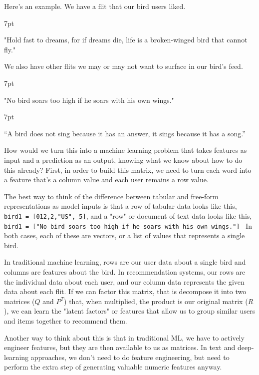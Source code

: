 \documentclass[11pt, table]{diazessay} %
\newenvironment{formal}{%
  \def\FrameCommand{%
	\hspace{1pt}%
	{\color{w_lightblue}\vrule width 2pt}%
	{\color{formalshade}\vrule width 4pt}%
	\colorbox{formalshade}%
  }%
  \MakeFramed{\advance\hsize-\width\FrameRestore}%
  \noindent\hspace{-4.55pt}%
  \begin{adjustwidth}{}{7pt}%
  \vspace{2pt}\vspace{2pt}%
}
{%
  \vspace{2pt}\end{adjustwidth}\endMakeFramed%
}
\begin{document}
\begin{sloppypar}
Here’s an example.  We have a flit that our bird users liked.

\begin{formal}
    "Hold fast to dreams, for if dreams die, life is a broken-winged bird that cannot fly."
\end{formal}

We also have other flits we may or may not want to surface in our bird's feed.

\begin{formal}
"No bird soars too high if he soars with his own wings."
\end{formal}

\begin{formal}
“A bird does not sing because it has an answer, it sings because it has a song.”
\end{formal}

How would we turn this into a machine learning problem that takes features as input and a prediction as an output, knowing what we know about how to do this already?  First, in order to build this matrix, we need to turn each word into a feature that's a column value and each user remains a row value.

The best way to think of the difference between tabular and free-form representations as model inputs is that a row of tabular data looks like this, \texttt{bird1 = [012,2,"US", 5]}, and a "row" or document of text data looks like this, \texttt{bird1 = ["No bird soars too high if he soars with his own wings."] } In both cases, each of these are vectors, or a list of values that represents a single bird.

In traditional machine learning, rows are our user data about a single bird and columns are features about the bird. In recommendation systems, our rows are the individual data about each user, and our column data represents the given data about each flit.  If we can factor this matrix, that is decompose it into two matrices ($Q$ and $P^T$) that, when multiplied, the product is our original matrix ($R$), we can learn the "latent factors" or features that allow us to group similar users and items together to recommend them.

Another way to think about this is that in traditional ML, we have to actively engineer features, but they are then available to us as matrices. In text and deep-learning approaches, we don't need to do feature engineering, but need to perform the extra step of generating valuable numeric features anyway.



\end{sloppypar}
\end{document}

